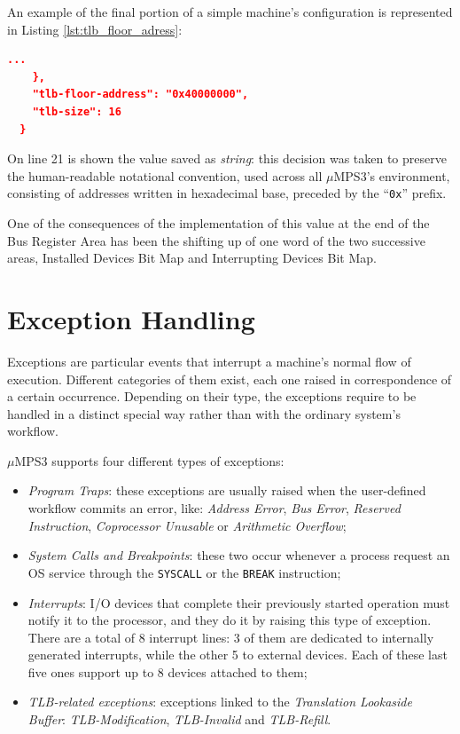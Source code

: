 \documentclass[12pt,a4paper,openright,twoside]{report}
\begin{document}
An example of the final portion of a simple machine's configuration is represented in Listing \ref{lst:tlb_floor_adress}:
\begin{lstlisting}[language=json,firstnumber=19,caption={TLB Floor Address},captionpos=b,label={lst:tlb_floor_adress}]
    ...
    },
    "tlb-floor-address": "0x40000000",
    "tlb-size": 16
  }
  \end{lstlisting}
On line 21 is shown the value saved as \textit{string}: this decision was taken to preserve the human-readable notational convention, used across all $\mu$MPS3's environment, consisting of addresses written in hexadecimal base, preceded by the ``\texttt{0x}'' prefix.

One of the consequences of the implementation of this value at the end of the Bus Register Area has been the shifting up of one word of the two successive areas, Installed Devices Bit Map and Interrupting Devices Bit Map.

\chapter{Exception Handling}
\label{chap:exception_handling}
\lhead[\fancyplain{}{\bfseries\thepage}]{\fancyplain{}{\bfseries\rightmark}}
Exceptions are particular events that interrupt a machine's normal flow of execution.
Different categories of them exist, each one raised in correspondence of a certain occurrence.
Depending on their type, the exceptions require to be handled in a distinct special way rather than with the ordinary system's workflow.

$\mu$MPS3 supports four different types of exceptions:
\begin{itemize}
	\item \textit{Program Traps}: these exceptions are usually raised when the user-defined workflow commits an error, like: \textit{Address Error}, \textit{Bus Error}, \textit{Reserved Instruction}, \textit{Coprocessor Unusable} or \textit{Arithmetic Overflow};
	\item \textit{System Calls and Breakpoints}: these two occur whenever a process request an OS service through the \texttt{SYSCALL} or the \texttt{BREAK} instruction;
	\item \textit{Interrupts}: I/O devices that complete their previously started operation must notify it to the processor, and they do it by raising this type of exception. There are a total of 8 interrupt lines: 3 of them are dedicated to internally generated interrupts, while the other 5 to external devices. Each of these last five ones support up to 8 devices attached to them;
	\item \textit{TLB-related exceptions}: exceptions linked to the \textit{Translation Lookaside Buffer}: \textit{TLB-Modification}, \textit{TLB-Invalid} and \textit{TLB-Refill}.
\end{itemize}
\end{document}
